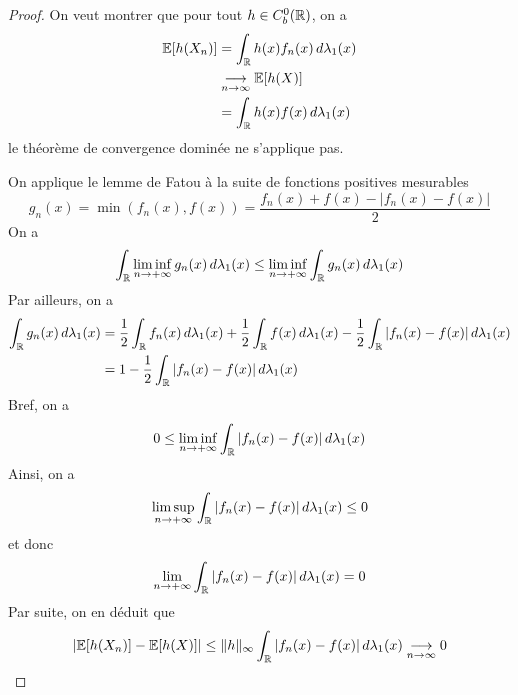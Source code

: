 \begin{proof}
    On veut montrer que pour tout \(h\in C_b^0(\mathbb{R})\), on a
    \begin{equation*}
        \begin{aligned}
            \mathbb{E}[h(X_n)]
            &= \int_{\mathbb{R}} h(x) f_n(x) \mathop{}\!{d} \lambda_1(x)\\
            &\underset{n\to\infty}{\longrightarrow} \mathbb{E}[h(X)]\\
            &= \int_{\mathbb{R}} h(x) f(x) \mathop{}\!{d} \lambda_1(x)
        \end{aligned}
    \end{equation*}
    le théorème de convergence dominée ne s'applique pas.

    On applique le lemme de Fatou à la suite de fonctions
    positives mesurables
    \begin{equation*}
        g_n(x) = \min(f_n(x),f(x)) = \frac{f_n(x)+f(x)-|f_n(x)-f(x)|}{2}
    \end{equation*}
    On a
    \begin{equation*}
        \int_{\mathbb{R}} \liminf_{n\to+\infty} g_n(x) \mathop{}\!{d} \lambda_1(x) \leq \liminf_{n\to+\infty} \int_{\mathbb{R}} g_n(x) \mathop{}\!{d} \lambda_1(x)
    \end{equation*}
    Par ailleurs, on a
    \begin{equation*}
        \begin{aligned}
            \int_{\mathbb{R}} g_n(x) \mathop{}\!{d} \lambda_1(x)
            &= \frac12 \int_{\mathbb{R}} f_n(x) \mathop{}\!{d} \lambda_1(x) + \frac12 \int_{\mathbb{R}} f(x) \mathop{}\!{d} \lambda_1(x) - \frac12 \int_{\mathbb{R}} |f_n(x)-f(x)| \mathop{}\!{d} \lambda_1(x)\\
            &= 1 - \frac12 \int_{\mathbb{R}} |f_n(x)-f(x)| \mathop{}\!{d} \lambda_1(x)
        \end{aligned}
    \end{equation*}
    Bref, on a
    \begin{equation*}
        0\leq \liminf_{n\to+\infty} \int_{\mathbb{R}} |f_n(x)-f(x)| \mathop{}\!{d} \lambda_1(x)
    \end{equation*}
    Ainsi, on a
    \begin{equation*}
        \limsup_{n\to+\infty} \int_{\mathbb{R}} |f_n(x)-f(x)| \mathop{}\!{d} \lambda_1(x) \leq 0
    \end{equation*}
    et donc
    \begin{equation*}
        \lim_{n\to+\infty} \int_{\mathbb{R}} |f_n(x)-f(x)| \mathop{}\!{d} \lambda_1(x) = 0
    \end{equation*}
    Par suite, on en déduit que
    \begin{equation*}
        \mathopen{}\left|\mathbb{E}[h(X_n)] - \mathbb{E}[h(X)]\right|\mathclose{} \leq \mathopen{}\left\|h\right\|\mathclose{}_{\infty} \int_{\mathbb{R}} |f_n(x)-f(x)| \mathop{}\!{d} \lambda_1(x) \underset{n\to\infty}{\longrightarrow} 0
    \end{equation*}
\end{proof}

